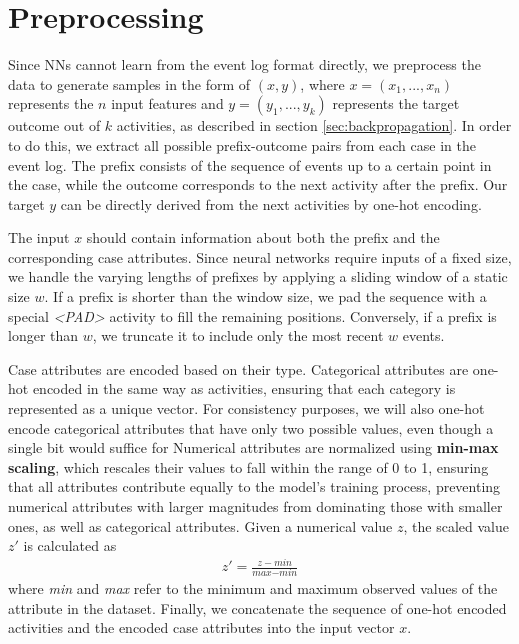 \section{Preprocessing}
\label{sec:preprocessing}
Since NNs cannot learn from the event log format directly,
we preprocess the data to generate samples in the form of $(x,y)$,
where $x = (x_1, ..., x_n)$ represents the $n$ input features and $y = (y_1, ..., y_k)$ represents the target outcome
out of $k$ activities, as described in section \ref{sec:backpropagation}. 
In order to do this, we extract all possible prefix-outcome pairs from each case in the event log.
The prefix consists of the sequence of events up to a certain point in the case,
while the outcome corresponds to the next activity after the prefix.
Our target $y$ can be directly derived from the next activities by one-hot encoding.

The input $x$ should contain information about both the prefix and the corresponding case attributes.
Since neural networks require inputs of a fixed size,
we handle the varying lengths of prefixes by applying a sliding window of a static size $w$.
If a prefix is shorter than the window size,
we pad the sequence with a special \textit{<PAD>} activity to fill the remaining positions.
Conversely, if a prefix is longer than $w$, we truncate it to include only the most recent $w$ events. 

Case attributes are encoded based on their type.
Categorical attributes are one-hot encoded in the same way as activities,
ensuring that each category is represented as a unique vector.
For consistency purposes, we will also one-hot encode categorical attributes that have only two possible values,
even though a single bit would suffice for 
Numerical attributes are normalized using \textbf{min-max scaling},
which rescales their values to fall within the range of 0 to 1,
ensuring that all attributes contribute equally to the model's training process,
preventing numerical attributes with larger magnitudes from dominating those with smaller ones,
as well as categorical attributes.
Given a numerical value $z$, the scaled value $z'$ is calculated as 
\begin{align}
    z' = \frac{z - \textit{min}}{\textit{max} - \textit{min}}
\end{align}
where \textit{min} and \textit{max} refer to the minimum and maximum observed values of the attribute in the dataset.
Finally, we concatenate the sequence of one-hot encoded activities
and the encoded case attributes into the input vector $x$.

